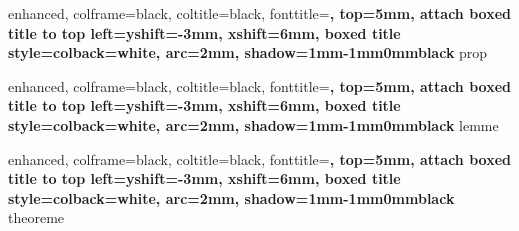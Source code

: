 \RequirePackage{amsthm}
\RequirePackage{amsmath}
\RequirePackage{amssymb}
\RequirePackage{tcolorbox}



\newtheorem{_definition}{Définition}[section]
\newenvironment{definition}[1][]{
    \begin{tcolorbox}[
        sharp corners,
        colback=white,
        colframe=black,
        leftrule=1mm,
        toprule=-1mm, bottomrule=-1mm, rightrule=-1mm,
        top=0mm, left=1mm
    ]
    \begin{_definition}#1~\par
}{%
    \end{_definition}%
    \end{tcolorbox}
}

%
{
    enhanced,
    colframe=black,
    coltitle=black, fonttitle=\bfseries,
    top=5mm,
    attach boxed title to top left={yshift=-3mm, xshift=6mm},
    boxed title style={colback=white, arc=2mm, shadow={1mm}{-1mm}{0mm}{black}}
}{prop}

%
{
    enhanced,
    colframe=black,
    coltitle=black, fonttitle=\bfseries,
    top=5mm,
    attach boxed title to top left={yshift=-3mm, xshift=6mm},
    boxed title style={colback=white, arc=2mm, shadow={1mm}{-1mm}{0mm}{black}}
}{lemme}

%
{
    enhanced,
    colframe=black,
    coltitle=black, fonttitle=\bfseries,
    top=5mm,
    attach boxed title to top left={yshift=-3mm, xshift=6mm},
    boxed title style={colback=white, arc=2mm, shadow={1mm}{-1mm}{0mm}{black}}
}{theoreme}

\newtheorem{_demonstration}{Démonstration}[section]
\newenvironment{demonstration}[1][]{
    \begin{_demonstration}[#1]~\par
}{%
    \end{_demonstration}%
    \qed%
}

\newtheorem{exemple}{Exemple}[section]

\newtheorem{remarque}{Remarque}[section]

\newenvironment{methode}[1][]{
    \begin{tcolorbox}[
        leftrule=-1mm, toprule=-1mm, bottomrule=-1mm, rightrule=-1mm,
    ]
    \textbf{Point méthode.}\space
}{
    \end{tcolorbox}
}